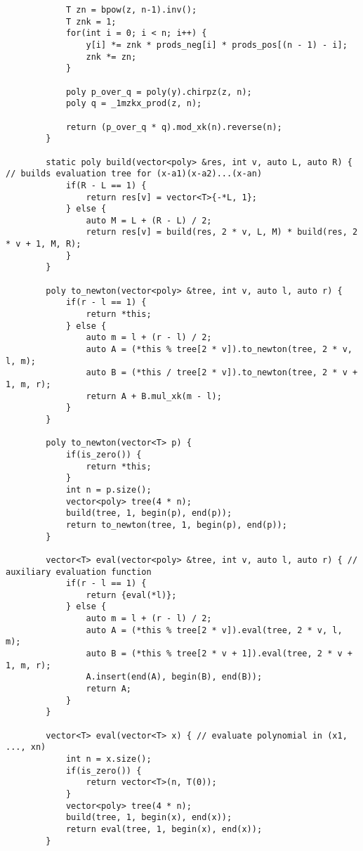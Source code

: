 \begin{lstlisting}
            T zn = bpow(z, n-1).inv();
            T znk = 1;
            for(int i = 0; i < n; i++) {
                y[i] *= znk * prods_neg[i] * prods_pos[(n - 1) - i];
                znk *= zn;
            }

            poly p_over_q = poly(y).chirpz(z, n);
            poly q = _1mzkx_prod(z, n);

            return (p_over_q * q).mod_xk(n).reverse(n);
        }

        static poly build(vector<poly> &res, int v, auto L, auto R) { // builds evaluation tree for (x-a1)(x-a2)...(x-an)
            if(R - L == 1) {
                return res[v] = vector<T>{-*L, 1};
            } else {
                auto M = L + (R - L) / 2;
                return res[v] = build(res, 2 * v, L, M) * build(res, 2 * v + 1, M, R);
            }
        }

        poly to_newton(vector<poly> &tree, int v, auto l, auto r) {
            if(r - l == 1) {
                return *this;
            } else {
                auto m = l + (r - l) / 2;
                auto A = (*this % tree[2 * v]).to_newton(tree, 2 * v, l, m);
                auto B = (*this / tree[2 * v]).to_newton(tree, 2 * v + 1, m, r);
                return A + B.mul_xk(m - l);
            }
        }

        poly to_newton(vector<T> p) {
            if(is_zero()) {
                return *this;
            }
            int n = p.size();
            vector<poly> tree(4 * n);
            build(tree, 1, begin(p), end(p));
            return to_newton(tree, 1, begin(p), end(p));
        }

        vector<T> eval(vector<poly> &tree, int v, auto l, auto r) { // auxiliary evaluation function
            if(r - l == 1) {
                return {eval(*l)};
            } else {
                auto m = l + (r - l) / 2;
                auto A = (*this % tree[2 * v]).eval(tree, 2 * v, l, m);
                auto B = (*this % tree[2 * v + 1]).eval(tree, 2 * v + 1, m, r);
                A.insert(end(A), begin(B), end(B));
                return A;
            }
        }
        
        vector<T> eval(vector<T> x) { // evaluate polynomial in (x1, ..., xn)
            int n = x.size();
            if(is_zero()) {
                return vector<T>(n, T(0));
            }
            vector<poly> tree(4 * n);
            build(tree, 1, begin(x), end(x));
            return eval(tree, 1, begin(x), end(x));
        }
        

\end{lstlisting}
